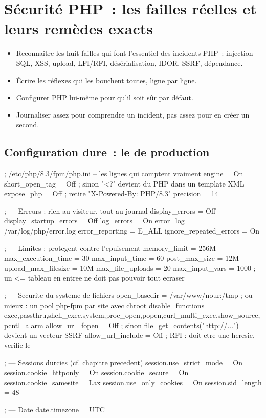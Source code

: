 \chapter{S\'ecurit\'e PHP~: les failles r\'eelles et leurs rem\`edes exacts}
\label{ch-php-secu}

\begin{objectif}
\begin{itemize}
  \item Reconna\^itre les huit failles qui font l'essentiel des incidents PHP~: injection SQL,
        XSS, upload, LFI/RFI, d\'es\'erialisation, IDOR, SSRF, d\'ependance.
  \item \'Ecrire les r\'eflexes qui les bouchent toutes, ligne par ligne.
  \item Configurer PHP lui-m\^eme pour qu'il soit s\^ur par d\'efaut.
  \item Journaliser assez pour comprendre un incident, pas assez pour en cr\'eer un second.
\end{itemize}
\end{objectif}

\section{Configuration dure~: le  de production}

\begin{codeconf}
; /etc/php/8.3/fpm/php.ini  -- les lignes qui comptent vraiment
engine = On
short_open_tag = Off                 ; sinon "<?" devient du PHP dans un template XML
expose_php = Off                     ; retire "X-Powered-By: PHP/8.3"
precision = 14

; --- Erreurs : rien au visiteur, tout au journal
display_errors = Off
display_startup_errors = Off
log_errors = On
error_log = /var/log/php/error.log
error_reporting = E_ALL
ignore_repeated_errors = On

; --- Limites : protegent contre l'epuisement
memory_limit = 256M
max_execution_time = 30
max_input_time = 60
post_max_size = 12M
upload_max_filesize = 10M
max_file_uploads = 20
max_input_vars = 1000                ; un <= tableau en entree ne doit pas pouvoir tout ecraser

; --- Securite du systeme de fichiers
open_basedir = /var/www/nour:/tmp    ; ou mieux : un pool php-fpm par site avec chroot
disable_functions = exec,passthru,shell_exec,system,proc_open,popen,curl_multi_exec,show_source,pcntl_alarm
allow_url_fopen = Off                ; sinon file_get_contents("http://...") devient un vecteur SSRF
allow_url_include = Off              ; RFI : doit etre une heresie, verifie-le

; --- Sessions durcies (cf. chapitre precedent)
session.use_strict_mode = On
session.cookie_httponly = On
session.cookie_secure = On
session.cookie_samesite = Lax
session.use_only_cookies = On
session.sid_length = 48

; --- Date
date.timezone = UTC
\end{codeconf}

